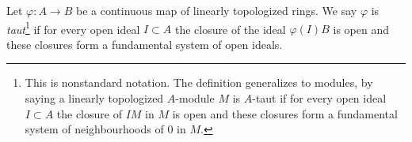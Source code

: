 \begin{definition}
\label{definition-taut}
Let $\varphi : A \to B$ be a continuous map of linearly topologized rings.
We say $\varphi$ is {\it taut}\footnote{This is nonstandard notation.
The definition generalizes to modules, by saying a linearly topologized
$A$-module $M$ is $A$-taut if for every open ideal $I \subset A$ the closure
of $IM$ in $M$ is open and these closures form a fundamental system of
neighbourhoods of $0$ in $M$.}
if for every open ideal $I \subset A$ the closure of the ideal $\varphi(I)B$
is open and these closures form a fundamental system of open ideals.
\end{definition}